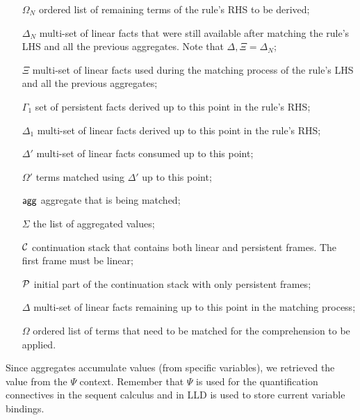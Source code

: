 \begin{enumerate}

   \item[$\Omega_N$] ordered list of remaining terms of the rule's RHS to be
      derived;

   \item[$\Delta_N$] multi-set of linear facts that were still available after
      matching the rule's LHS and all the previous aggregates. Note that
      $\Delta, \Xi = \Delta_N$;

   \item[$\Xi$] multi-set of linear facts used during the matching process of
      the rule's LHS and all the previous aggregates;

   \item[$\Gamma_{1}$] set of persistent facts derived up to this point in the
   rule's RHS;

   \item[$\Delta_{1}$] multi-set of linear facts derived up to this point in
   the rule's RHS;

   \item[$\Delta'$] multi-set of linear facts consumed up to this point;

   \item[$\Omega'$] terms matched using $\Delta'$ up to this point;

   \item[$\mathsf{agg}$] aggregate that is being matched;

   \item[$\Sigma$] the list of aggregated values;

   \item[$\mathcal{C}$] continuation stack that contains both linear and persistent
   frames. The first frame must be linear;

   \item[$\mathcal{P}$] initial part of the continuation stack with only persistent
   frames;

   \item[$\Delta$] multi-set of linear facts remaining up to this point in the
   matching process;

   \item[$\Omega$] ordered list of terms that need to be matched for the
   comprehension to be applied.

\end{enumerate}

Since aggregates accumulate values (from specific variables), we retrieved the
value from the $\Psi$ context. Remember that $\Psi$ is used for the
quantification connectives in the sequent calculus and in LLD is used to store
current variable bindings.

